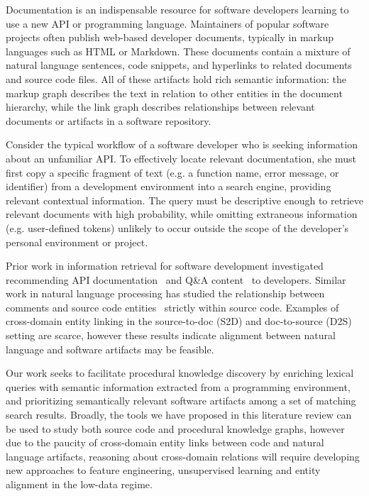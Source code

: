 \documentclass[11pt]{article}
\begin{document}
    Documentation is an indispensable resource for software developers learning to use a new API or programming language. Maintainers of popular software projects often publish web-based developer documents, typically in markup languages such as HTML or Markdown. These documents contain a mixture of natural language sentences, code snippets, and hyperlinks to related documents and source code files. All of these artifacts hold rich semantic information: the markup graph describes the text in relation to other entities in the document hierarchy, while the link graph describes relationships between relevant documents or artifacts in a software repository.

     Consider the typical workflow of a software developer who is seeking information about an unfamiliar API. To effectively locate relevant documentation, she must first copy a specific fragment of text (e.g. a function name, error message, or identifier) from a development environment into a search engine, providing relevant contextual information. The query must be descriptive enough to retrieve relevant documents with high probability, while omitting extraneous information (e.g. user-defined tokens) unlikely to occur outside the scope of the developer's personal environment or project.

    Prior work in information retrieval for software development investigated recommending API documentation~\cite{robillard2015recommending} and Q\&A content~\cite{treude2016augmenting} to developers. Similar work in natural language processing has studied the relationship between comments and source code entities~\cite{iyer2018mapping, panthaplackel2020associating} strictly within source code. Examples of cross-domain entity linking in the source-to-doc (S2D) and doc-to-source (D2S) setting are scarce, however these results indicate alignment between natural language and software artifacts may be feasible.

    Our work seeks to facilitate procedural knowledge discovery by enriching lexical queries with semantic information extracted from a programming environment, and prioritizing semantically relevant software artifacts among a set of matching search results. Broadly, the tools we have proposed in this literature review can be used to study both source code and procedural knowledge graphs, however due to the paucity of cross-domain entity links between code and natural language artifacts, reasoning about cross-domain relations will require developing new approaches to feature engineering, unsupervised learning and entity alignment in the low-data regime.
\end{document}
